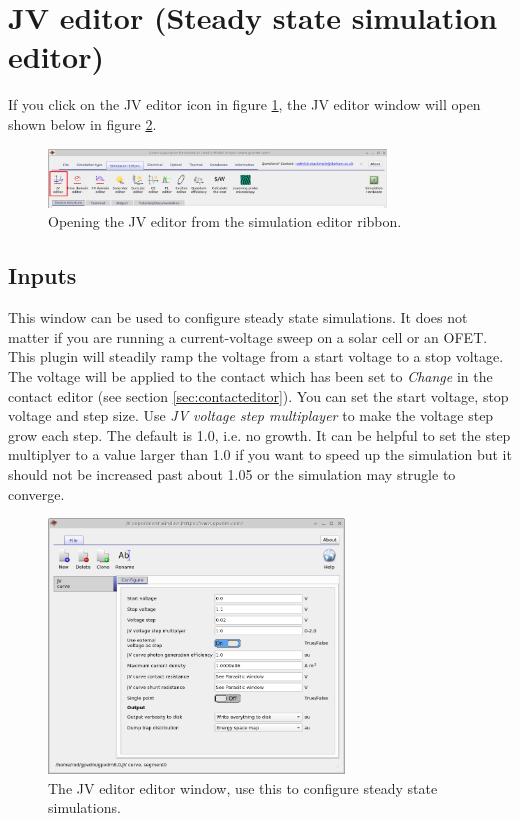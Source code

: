 \newpage
\section{JV editor (Steady state simulation editor)}
If you click on the JV editor icon in figure \ref{fig:ribbon_jv}, the JV editor window will open shown below in figure \ref{fig:jvcurveeditor}.

\begin{figure}[H]
\centering
\includegraphics[width=0.8\textwidth]{./images/sim_editors/ribbon_jv.png}
\caption{Opening the JV editor from the simulation editor ribbon.}
\label{fig:ribbon_jv}
\end{figure}

\subsection{Inputs}

This window can be used to configure steady state simulations. It does not matter if you are running a current-voltage sweep on a solar cell or an OFET.  This plugin will steadily ramp the voltage from a start voltage to a stop voltage.  The voltage will be applied to the contact which has been set to \emph{Change} in the contact editor (see section \ref{sec:contacteditor}). You can set the start voltage, stop voltage and step size.  Use \emph{JV voltage step multiplayer} to make the voltage step grow each step.  The default is 1.0, i.e. no growth. It can be helpful to set the step multiplyer to a value larger than 1.0 if you want to speed up the simulation but it should not be increased past about 1.05 or the simulation may strugle to converge.

\begin{figure}[H]
\centering
\includegraphics[width=0.7\textwidth,height=0.6\textwidth]{./images/sim_editors/jv_editor.png}
\caption{The JV editor editor window, use this to configure steady state simulations.}
\label{fig:jvcurveeditor}
\end{figure}

